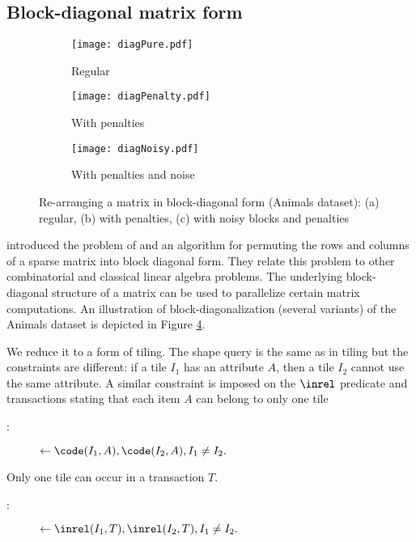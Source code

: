 \subsection{Block-diagonal matrix form}\label{subsec:blockdiagonal}
\begin{figure}[t]
\begin{center}
\begin{subfigure}{.32\textwidth}
  \texttt{[image: diagPure.pdf]}
  \captionsetup{skip=-5pt}
  \caption{Regular}
  \label{fig:regular_block_diagonal}
\end{subfigure}
   \hfill 
\begin{subfigure}{.32\textwidth}
  \texttt{[image: diagPenalty.pdf]}
  \captionsetup{skip=-5pt}
  \caption{With penalties}
  \label{fig:penalty_block_diagonal}
\end{subfigure}
\begin{subfigure}{.32\textwidth}
  \texttt{[image: diagNoisy.pdf]}
  \captionsetup{skip=-5pt}
  \caption{With penalties and noise}
  \label{fig:noisy_block_diagonal}
\end{subfigure}
\end{center}
\captionsetup{skip=-8pt}
\caption{Re-arranging a matrix in block-diagonal form (Animals dataset): (a) regular, (b) with penalties, (c) with noisy blocks and penalties}
\label{fig:diag_examples}
\end{figure}

\citet{blockdiagonal} introduced the problem of and an algorithm for permuting the rows and columns of a sparse matrix into block diagonal form. 
They relate this problem to other combinatorial and classical linear algebra problems. The underlying block-diagonal structure of a matrix can be used to parallelize certain matrix computations. An illustration of block-diagonalization (several variants) of the Animals dataset is depicted in Figure \ref{fig:diag_examples}.

We reduce it to a form of tiling. The shape query is the same as in tiling but the constraints are different: if a tile $I_1$ has an attribute $A$, then a tile $I_2$ cannot use the same attribute. A similar constraint is imposed on the $\inrel$ predicate and transactions stating that each item $A$ can belong to only one tile
\begin{description}
\item[\blockedItems:] $\leftarrow \code(I_1,A), \code(I_2,A), I_1 \neq I_2. $
\end{description}
Only one tile can occur in a transaction $T$.
\begin{description}
\item[\blockedTranst:] $\leftarrow  \inrel(I_1,T), \inrel(I_2,T), I_1 \neq I_2. $
\end{description}

